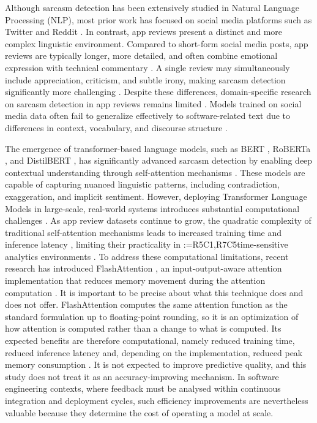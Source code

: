 \documentclass[a4paper,fleqn]{cas-sc}
\makeatletter
\newif\iftracked
\newcommand{\rv@setcolour}[1]{%
  \IfStrEq{#1}{R7C7}{\color{rvEdit}}{%
    \IfSubStr{#1}{R5}{\IfSubStr{#1}{R7}{\color{rvBoth}}{\color{rvFive}}}{\color{rvSeven}}}}
\newcommand{\rv@tag}[1]{\textsuperscript{\sffamily\bfseries\scriptsize[\StrSubstitute{#1}{,}{, }]}\,}
\newcommand{\rv@recordone}[1]{%
  \edef\rv@i{#1}%
  \ifcsdef{rv@n@\rv@i}{}{\csgdef{rv@n@\rv@i}{0}}%
  \csxdef{rv@n@\rv@i}{\the\numexpr\csuse{rv@n@\rv@i}+1\relax}%
  \begingroup\edef\@currentlabel{\rv@i}\label{rv:\rv@i:\csuse{rv@n@\rv@i}}\endgroup}
\newcommand{\rv@record}[1]{\@for\rv@id:=#1\do{\expandafter\rv@recordone\expandafter{\rv@id}}}
\DeclareRobustCommand{\rcrep}[3]{\rv@record{#1}\iftracked{\rv@setcolour{#1}\rv@tag{#1}\rv@strike{#2} #3}\else#3\fi}
\makeatother
\begin{document}
Although sarcasm detection has been extensively studied in Natural Language Processing (NLP), most prior work has focused on social media platforms \citep{gonzalez2011identifying} such as Twitter \citep{poria2016deeper} and Reddit \citep{adedigba2025systematic}. In contrast, app reviews present a distinct and more complex linguistic environment. Compared to short-form social media posts, app reviews are typically longer, more detailed, and often combine emotional expression with technical commentary \citep{veeramani2024harnessing}. A single review may simultaneously include appreciation, criticism, and subtle irony, making sarcasm detection significantly more challenging \citep{haripriya2017survey,adedigba2025systematic}. Despite these differences, domain-specific research on sarcasm detection in app reviews remains limited \citep{maalej2015bug,ciurumelea2017analyzing}. Models trained on social media data often fail to generalize effectively to software-related text due to differences in context, vocabulary, and discourse structure \citep{gambo2024extracting,adedigba2025systematic}.

The emergence of transformer-based language models, such as BERT \citep{devlin2019bert}, RoBERTa \citep{liu2020roberta}, and DistilBERT \citep{sanh2019distilbert}, has significantly advanced sarcasm detection by enabling deep contextual understanding through self-attention mechanisms \citep{vaswani2017attention}. These models are capable of capturing nuanced linguistic patterns, including contradiction, exaggeration, and implicit sentiment. However, deploying Transformer Language Models in large-scale, real-world systems introduces substantial computational challenges \citep{wolf2020transformers}. As app review datasets continue to grow, the quadratic complexity of traditional self-attention mechanisms \citep{brauwers2021general} leads to increased training time and inference latency \citep{dao2024flashattention2}, limiting their practicality in \rcrep{R5C1,R7C5}{real-time}{time-sensitive} analytics environments \citep{rabe2021self}. To address these computational limitations, recent research has introduced FlashAttention \citep{dao2022flashattention}, an input-output-aware attention implementation that reduces memory movement during the attention computation \citep{wolf2020transformers,rabe2021self}. It is important to be precise about what this technique does and does not offer. FlashAttention computes the same attention function as the standard formulation up to floating-point rounding, so it is an optimization of how attention is computed rather than a change to what is computed. Its expected benefits are therefore computational, namely reduced training time, reduced inference latency and, depending on the implementation, reduced peak memory consumption \citep{dao2024flashattention2,liu2023efficientvit}. It is not expected to improve predictive quality, and this study does not treat it as an accuracy-improving mechanism. In software engineering contexts, where feedback must be analysed within continuous integration and deployment cycles, such efficiency improvements are nevertheless valuable because they determine the cost of operating a model at scale.
\end{document}
